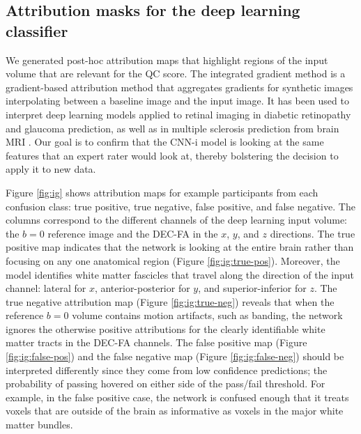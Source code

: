 \documentclass[fleqn,10pt]{wlscirep}
\begin{document}
\subsection*{Attribution masks for the deep learning classifier}

We generated post-hoc attribution maps that highlight regions of the input
volume that are relevant for the QC score. The integrated gradient method
\cite{sundararajan2017axiomatic} is a gradient-based attribution method
\cite{ancona2019gradient} that aggregates gradients for synthetic images
interpolating between a baseline image and the input image. It has been used to
interpret deep learning models applied to retinal imaging in diabetic
retinopathy \cite{sayres2019using} and glaucoma \cite{Mehta2021-zp} prediction,
as well as in multiple sclerosis prediction from brain MRI
\cite{wargnier-dauchelle2021interpretable}. Our goal is to confirm that the
CNN-i model is looking at the same features that an expert rater would look at,
thereby bolstering the decision to apply it to new data.

Figure \ref{fig:ig} shows attribution maps for example participants from each
confusion class: true positive, true negative, false positive, and false
negative. The columns correspond to the different channels of the deep learning
input volume: the $b=0$ reference image and the DEC-FA in the $x$, $y$, and $z$
directions. The true positive map indicates that the network is looking at the
entire brain rather than focusing on any one anatomical region (Figure
\ref{fig:ig:true-pos}). Moreover, the model identifies white matter fascicles
that travel along the direction of the input channel: lateral for $x$,
anterior-posterior for $y$, and superior-inferior for $z$. The true negative
attribution map (Figure \ref{fig:ig:true-neg}) reveals that when the reference
$b=0$ volume contains motion artifacts, such as banding, the network ignores the
otherwise positive attributions for the clearly identifiable white matter tracts
in the DEC-FA channels. The false positive map (Figure \ref{fig:ig:false-pos})
and the false negative map (Figure \ref{fig:ig:false-neg}) should be interpreted
differently since they come from low confidence predictions; the probability of
passing hovered on either side of the pass/fail threshold. For example, in the
false positive case, the network is confused enough that it treats voxels that
are outside of the brain as informative as voxels in the major white matter
bundles.
\end{document}
